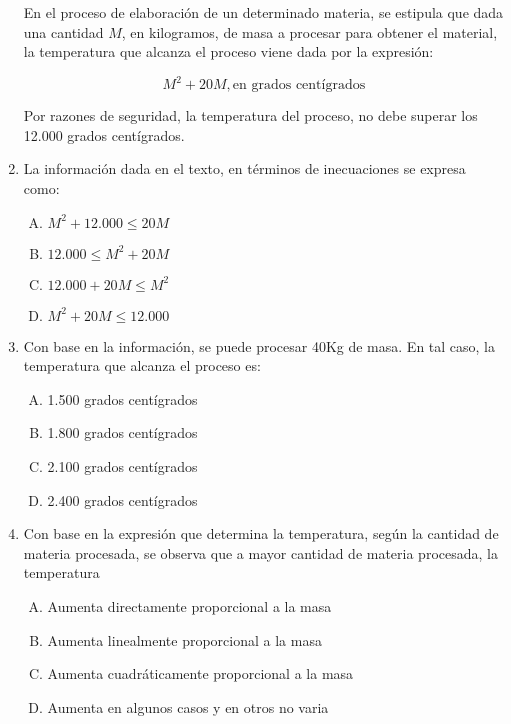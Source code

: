 \begin{enumerate}
\noindent En el proceso de elaboración de un determinado materia, se estipula que dada una cantidad $M$, en kilogramos, de masa a procesar para obtener el material, la temperatura que alcanza el proceso viene dada por la expresión: 

\begin{equation*}
M^2+20M, \text{en grados centígrados}
\end{equation*}

Por razones de seguridad, la temperatura del proceso, no debe superar los 12.000 grados centígrados.

\item La información dada en el texto, en términos de inecuaciones se expresa como:  \label{yolma-6}\\

\begin{enumerate}[(A)]
\item  $M^2+12.000\leq 20M$
\item $12.000\leq M^2+20M$
\item $12.000+20M\leq M^2$
\item $M^2+20M\leq 12.000$
\end{enumerate}


\item Con base en la información, se puede procesar 40Kg de masa. En tal caso, la temperatura que alcanza el proceso es:\label{yolma-7}\\

\begin{enumerate}[(A)]
\item  1.500 grados centígrados
\item 1.800 grados centígrados
\item 2.100 grados centígrados
\item 2.400 grados centígrados
\end{enumerate}


\item  Con base en la expresión que determina la temperatura, según la cantidad de materia procesada, se observa que a mayor cantidad de materia procesada,  la temperatura \label{yolma-8}\\

\begin{enumerate}[(A)]
\item  Aumenta directamente proporcional a la masa
\item Aumenta linealmente proporcional a la masa
\item Aumenta cuadráticamente proporcional a la masa
\item Aumenta en algunos casos y en otros no varia
\end{enumerate}


\end{enumerate}
